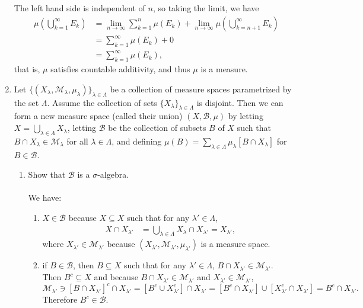 \begin{enumerate}
	The left hand side is independent of $n$, so taking the limit, we have
	\begin{align*}
		\mu(\bigcup_{k=1}^\infty E_k)&=\lim_{n\to\infty}\sum_{k=1}^n\mu( E_k)+\lim_{n\to\infty}\mu(\bigcup_{k={n+1}}^\infty E_k)\\
		&=\sum_{k=1}^\infty\mu( E_k)+0\\
		&=\sum_{k=1}^\infty\mu( E_k),
	\end{align*}
	that is, $\mu$ satisfies countable additivity, and thus $\mu$ is a measure.
	\item Let $\{(X_\lambda,\mathcal{M}_\lambda,\mu_\lambda)\}_{\lambda\in\Lambda}$ be a collection of measure spaces parametrized by the set $\Lambda$.
	Assume the collection of sets $\{X_\lambda\}_{\lambda\in\Lambda}$ is disjoint.
	Then we can form a new measure space (called their union) $(X,\mathcal{B},\mu)$ by letting $X=\bigcup_{\lambda\in\Lambda}X_\lambda$, letting $\mathcal{B}$ be the collection of subsets $B$ of $X$ such that $B\cap X_\lambda\in\mathcal{M}_\lambda$ for all $\lambda\in\Lambda$, and defining $\mu(B)=\sum_{\lambda\in\Lambda}\mu_\lambda[B\cap X_\lambda]$ for $B\in\mathcal{B}$.
	\begin{enumerate}[label=(\roman*),align=left]   
		\item Show that $\mathcal{B}$ is a $\sigma$-algebra.\\
		\\We have:
		\begin{enumerate}[label=(\roman*),align=left]   
			\item $X\in\mathcal{B}$ because $X\subseteq X$ such that for any $\lambda'\in\Lambda$,
			\begin{align*}
				X\cap X_{\lambda'}&= \bigcup_{\lambda\in\Lambda}X_\lambda\cap X_{\lambda'}= X_{\lambda'},
			\end{align*}
			where $X_{\lambda'}\in\mathcal{M}_{\lambda'}$ because $(X_{\lambda'},\mathcal{M}_{\lambda'},\mu_{\lambda'})$ is a measure space.
			\item if $B\in\mathcal{B}$, then $B\subseteq X$ such that for any $\lambda'\in\Lambda$, $B\cap X_{\lambda'}\in\mathcal{M}_{\lambda'}$.\\
			Then $B^c\subseteq X$ and because $ B\cap X_{\lambda'}\in\mathcal{M}_{\lambda'}$ and $X_{\lambda'}\in\mathcal{M}_{\lambda'}$,
			\[
				\mathcal{M}_{\lambda'}\ni[ B\cap X_{\lambda'}]^c\cap X_{\lambda'}=[B^c\cup X_{\lambda'}^c]\cap X_{\lambda'}=[B^c\cap X_{\lambda'}]\cup[X_{\lambda'}^c\cap X_{\lambda'}]=B^c\cap X_{\lambda'}.
			\]
			Therefore $B^c\in\mathcal{B}$.

\end{enumerate}
\end{enumerate}
\end{enumerate}
